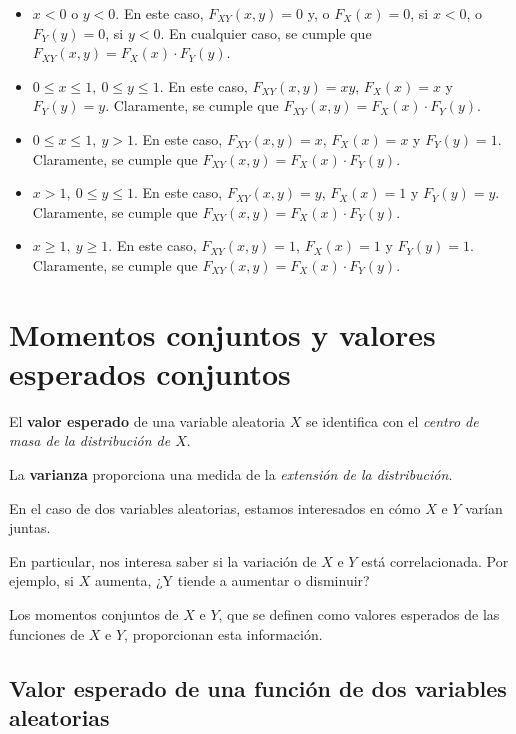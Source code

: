 \documentclass[]{book}
\begin{document}
\begin{itemize}
\item
  \(x<0\) o \(y<0\). En este caso, \(F_{XY}(x,y)=0\) y, o \(F_X(x)=0\), si \(x<0\), o \(F_Y(y)=0\), si \(y<0\). En cualquier caso, se cumple que \(F_{XY}(x,y)=F_X(x)\cdot F_Y(y)\).
\item
  \(0\leq x\leq 1,\ 0\leq y\leq 1\). En este caso, \(F_{XY}(x,y)=xy\), \(F_X(x)=x\) y \(F_Y(y)=y\). Claramente, se cumple que \(F_{XY}(x,y)=F_X(x)\cdot F_Y(y)\).
\item
  \(0\leq x\leq 1,\ y> 1\). En este caso, \(F_{XY}(x,y)=x\), \(F_X(x)=x\) y \(F_Y(y)=1\). Claramente, se cumple que \(F_{XY}(x,y)=F_X(x)\cdot F_Y(y)\).
\item
  \(x >1,\ 0\leq y\leq 1\). En este caso, \(F_{XY}(x,y)=y\), \(F_X(x)=1\) y \(F_Y(y)=y\). Claramente, se cumple que \(F_{XY}(x,y)=F_X(x)\cdot F_Y(y)\).
\item
  \(x\geq 1,\ y\geq 1\). En este caso, \(F_{XY}(x,y)=1\), \(F_X(x)=1\) y \(F_Y(y)=1\). Claramente, se cumple que \(F_{XY}(x,y)=F_X(x)\cdot F_Y(y)\).
\end{itemize}

\hypertarget{momentos-conjuntos-y-valores-esperados-conjuntos}{%
\section{Momentos conjuntos y valores esperados conjuntos}\label{momentos-conjuntos-y-valores-esperados-conjuntos}}

El \textbf{valor esperado} de una variable aleatoria \(X\) se identifica con el \emph{centro de masa de la distribución de \(X\)}.

La \textbf{varianza} proporciona una medida de la \emph{extensión de la distribución}.

En el caso de dos variables aleatorias, estamos interesados en cómo \(X\) e \(Y\) varían juntas.

En particular, nos interesa saber si la variación de \(X\) e \(Y\) está correlacionada. Por ejemplo, si \(X\) aumenta, ¿Y tiende a aumentar o disminuir?

Los momentos conjuntos de \(X\) e \(Y\), que se definen como valores esperados de las funciones de \(X\) e \(Y\), proporcionan esta información.

\hypertarget{valor-esperado-de-una-funciuxf3n-de-dos-variables-aleatorias}{%
\subsection{Valor esperado de una función de dos variables aleatorias}\label{valor-esperado-de-una-funciuxf3n-de-dos-variables-aleatorias}}
\end{document}
